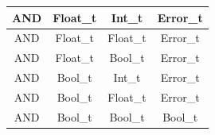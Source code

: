 \begin{figure}[H]
\begin{tabular}{cccc}
        \midrule AND & Float\_t & Int\_t    & Error\_t \\
        \midrule AND & Float\_t & Float\_t  & Error\_t \\
        \midrule AND & Float\_t & Bool\_t   & Error\_t \\

        \midrule AND & Bool\_t & Int\_t     & Error\_t \\
        \midrule AND & Bool\_t & Float\_t   & Error\_t \\
        \midrule AND & Bool\_t & Bool\_t    & Bool\_t \\

        \bottomrule
    \end{tabular}\\
\end{figure}

\newpage

